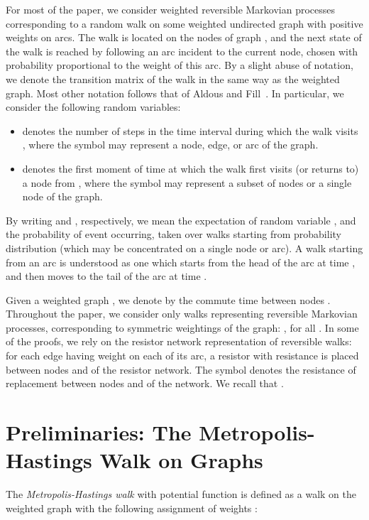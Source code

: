 \documentclass[11pt,a4paper]{article}
\renewcommand{\*}{\hspace*{5mm}}
\begin{document}
For most of the paper, we consider weighted reversible Markovian processes corresponding to a random walk  on some weighted undirected graph  with positive weights on arcs. The walk is located on the nodes of graph , and the next state of the walk is reached by following an arc incident to the current node, chosen with probability proportional to the weight of this arc. By a slight abuse of notation, we denote the transition matrix of the walk in the same way as the weighted graph. Most other notation follows that of Aldous and Fill~\cite{AF}. In particular, we consider the following random variables:
\begin{itemize}
\item  denotes the number of steps in the time interval  during which the walk visits , where the symbol  may represent a node, edge, or arc of the graph.
\item  denotes the first moment of time  at which the walk first visits (or returns to) a node from , where the symbol  may represent a subset of nodes or a single node of the graph.
\end{itemize}
By writing  and , respectively, we mean the expectation of random variable , and the probability of event  occurring, taken over walks starting from probability distribution  (which may be concentrated on a single node or arc). A walk starting from an arc is understood as one which starts from the head of the arc at time , and then moves to the tail of the arc at time .

Given a weighted graph , we denote by  the commute time between nodes . Throughout the paper, we consider only walks representing reversible Markovian processes, corresponding to symmetric weightings of the graph: , for all . In some of the proofs, we rely on the resistor network representation of reversible walks: for each edge  having weight  on each of its arc, a resistor with resistance  is placed between nodes  and  of the resistor network. The symbol  denotes the resistance of replacement between nodes  and  of the network. We recall that .~\cite{CRRST}

\section{Preliminaries: The Metropolis-Hastings Walk on Graphs}\label{sec2}\label{sec22}


The \emph{Metropolis-Hastings walk} with potential function  is defined as a walk on the weighted graph  with the following assignment of weights :
\end{document}
